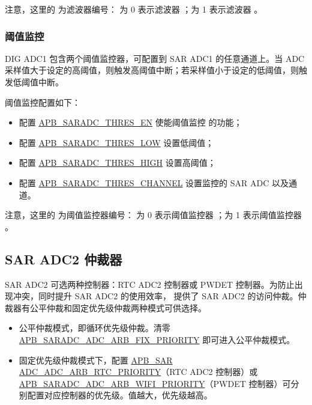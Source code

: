 \documentclass[main\_\_CN.tex]{subfiles}
\begin{document}
注意，这里的  为滤波器编号： 为 0 表示滤波器 ；为 1 表示滤波器 。

\subsubsection{阈值监控}
DIG ADC1 包含两个阈值监控器，可配置到 SAR ADC1 的任意通道上。当 ADC 采样值大于设定的高阈值，则触发高阈值中断；若采样值小于设定的低阈值，则触发低阈值中断。

阈值监控配置如下：
\begin{itemize}
    \item 配置 \hyperref[fielddesc:APBSARADCTHRES0EN]{APB\_SARADC\_THRES\_EN} 使能阈值监控  的功能；
    \item 配置 \hyperref[fielddesc:APBSARADCTHRES0LOW]{APB\_SARADC\_THRES\_LOW} 设置低阈值；
    \item 配置 \hyperref[fielddesc:APBSARADCTHRES0LOW]{APB\_SARADC\_THRES\_HIGH} 设置高阈值；
    \item 配置 \hyperref[fielddesc:APBSARADCTHRES0LOW]{APB\_SARADC\_THRES\_CHANNEL} 设置监控的 SAR ADC 以及通道。
\end{itemize}

注意，这里的  为阈值监控器编号： 为 0 表示阈值监控器 ；为 1 表示阈值监控器 。

\subsection{SAR ADC2 仲裁器}

SAR ADC2 可选两种控制器：RTC ADC2 控制器或 PWDET 控制器。为防止出现冲突，同时提升 SAR ADC2 的使用效率，\chipname{} 提供了 SAR ADC2 的访问仲裁。仲裁器有公平仲裁和固定优先级仲裁两种模式可供选择。

\begin{itemize}
    \item 公平仲裁模式，即循环优先级仲裁。清零 \hyperref[fielddesc:APBSARADCADCARBFIXPRIORITY]{APB\_SARADC\_ADC\_ARB\_FIX\_PRIORITY} 即可进入公平仲裁模式。
    \item 固定优先级仲裁模式下，配置 \hyperref[fielddesc:APBSARADCADCARBRTCPRIORITY]{APB\_SAR\\ADC\_ADC\_ARB\_RTC\_PRIORITY}（RTC ADC2 控制器）或 \hyperref[fielddesc:APBSARADCADCARBWIFIPRIORITY]{APB\_SARADC\_ADC\_ARB\_WIFI\_PRIORITY}（PWDET 控制器）可分别配置对应控制器的优先级。值越大，优先级越高。
\end{itemize}
\end{document}
